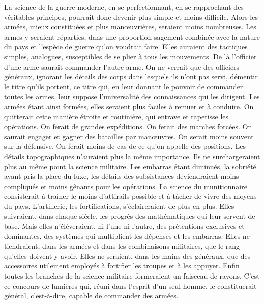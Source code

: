 \documentclass[french,twoside]{book} %
\begin{document}
La science de la guerre moderne, en se perfectionnant, en se rapprochant des véritables principes, pourrait donc devenir plus simple et moins difficile. Alors les armées, mieux constituées et plus manœuvrières, seraient moins nombreuses. Les armes y seraient réparties, dans une proportion sagement combinée avec la nature du pays et l’espèce de guerre qu’on voudrait faire. Elles auraient des tactiques simples, analogues, susceptibles de se plier à tous les mouvements. De là l’officier d’une arme saurait commander l’autre arme. On ne verrait que des officiers généraux, ignorant les détails des corps dans lesquels ils n’ont pas servi, démentir le titre qu’ils portent, ce titre qui, en leur donnant le pouvoir de commander toutes les armes, leur suppose l’universalité des connaissances qui les dirigent. Les armées étant ainsi formées, elles seraient plus faciles à remuer et à conduire. On quitterait cette manière étroite et routinière, qui entrave et rapetisse les opérations. On ferait de grandes expéditions. On ferait des marches forcées. On saurait engager et gagner des batailles par manœuvres. On serait moins souvent sur la défensive. On ferait moins de cas de ce qu’on appelle des positions. Les détails topographiques n’auraient plus la même importance. Ils ne surchargeraient plus au même point la science militaire. Les embarras étant diminués, la sobriété ayant pris la place du luxe, les détails des subsistances deviendraient moins compliqués et moins gênants pour les opérations. La science du munitionnaire consisterait à traîner le moins d’attirails possible et à tâcher de vivre des moyens du pays. L’artillerie, les fortifications, s’éclaireraient de plus en plus. Elles suivraient, dans chaque siècle, les progrès des mathématiques qui leur servent de base. Mais elles n’élèveraient, ni l’une ni l’autre, des prétentions exclusives et dominantes, des systèmes qui multiplient les dépenses et les embarras. Elles ne tiendraient, dans les armées et dans les combinaisons militaires, que le rang qu’elles doivent y avoir. Elles ne seraient, dans les mains des généraux, que des accessoires utilement employés à fortifier les troupes et à les appuyer. Enfin toutes les branches de la science militaire formeraient un faisceau de rayons. C’est ce concours de lumières qui, réuni dans l’esprit d’un seul homme, le constituerait général, c’est-à-dire, capable de commander des armées.\par
\end{document}
